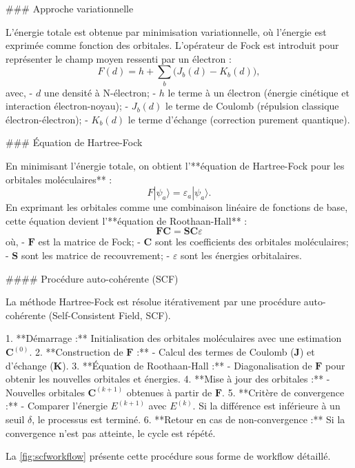 \documentclass[12pt,a4paper]{report}
\begin{document}
\begin{markdown}
### Approche variationnelle

L’énergie totale est obtenue par minimisation variationnelle, où l'énergie est exprimée comme fonction des orbitales. L'opérateur de Fock est introduit pour représenter le champ moyen ressenti par un électron :
\[
F(d) = h + \sum_{b} \big(J_b(d) - K_b(d)\big) ,
\]
avec,
- $d$ une densité à N-électron;
- \(h\) le terme à un électron (énergie cinétique et interaction électron-noyau);
- \(J_b(d)\) le terme de Coulomb (répulsion classique électron-électron);
- \(K_b(d)\) le terme d'échange (correction purement quantique).

### Équation de Hartree-Fock

En minimisant l'énergie totale, on obtient l'**équation de Hartree-Fock pour les orbitales moléculaires** :
\[
F|\psi_a\rangle = \varepsilon_a|\psi_a\rangle .
\]
En exprimant les orbitales comme une combinaison linéaire de fonctions de base, cette équation devient l'**équation de Roothaan-Hall** :
\[
\mathbf{F}\mathbf{C} = \mathbf{S}\mathbf{C}\varepsilon
\]
où,
- \(\mathbf{F}\) est la matrice de Fock;
- \(\mathbf{C}\) sont les coefficients des orbitales moléculaires;
- \(\mathbf{S}\) sont les matrice de recouvrement;
- \(\varepsilon\) sont les énergies orbitalaires.

#### Procédure auto-cohérente (SCF)

La méthode Hartree-Fock est résolue itérativement par une procédure auto-cohérente (Self-Consistent Field, SCF).

1. **Démarrage :** Initialisation des orbitales moléculaires avec une estimation \(\mathbf{C}^{(0)}\).
2. **Construction de \(\mathbf{F}\) :**
   - Calcul des termes de Coulomb (\(\mathbf{J}\)) et d'échange (\(\mathbf{K}\)).
3. **Équation de Roothaan-Hall :**
   - Diagonalisation de \(\mathbf{F}\) pour obtenir les nouvelles orbitales et énergies.
4. **Mise à jour des orbitales :**
   - Nouvelles orbitales \(\mathbf{C}^{(k+1)}\) obtenues à partir de \(\mathbf{F}\).
5. **Critère de convergence :**
   - Comparer l'énergie \(E^{(k+1)}\) avec \(E^{(k)}\). Si la différence est inférieure à un seuil \(\delta\), le processus est terminé.
6. **Retour en cas de non-convergence :** Si la convergence n’est pas atteinte, le cycle est répété.

La \autoref{fig:scfworkflow} présente cette procédure sous forme de workflow détaillé.


\end{markdown}
\end{document}
